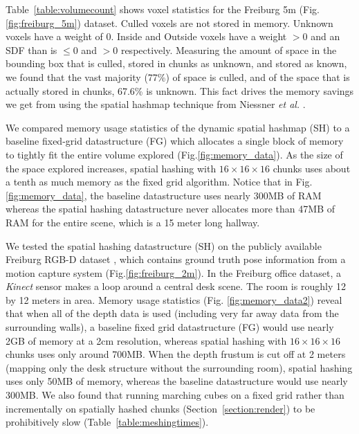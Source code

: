 \documentclass[conference]{IEEEtran}
\newcommand{\sref}[1]{Section~\ref{#1}}
\newcommand{\figref}[1]{Fig.\ref{#1}}
\newcommand{\tabref}[1]{Table~\ref{#1}}
\newcommand{\naive}{baseline\xspace}
\newcommand{\etal}{\textit{et al. }}
\begin{document}
\tabref{table:volumecount} shows voxel statistics for the Freiburg 5m
(\figref{fig:freiburg_5m}) dataset. Culled voxels are not stored in  memory.
Unknown voxels have a weight of 0. Inside and Outside voxels have a weight $>
0$ and an SDF than is $\leq 0$ and $> 0$ respectively. Measuring the amount of
space in the bounding box that is culled, stored in chunks as unknown, and
stored as known, we found that the vast majority (77\%) of space is culled, and
of the space that is actually stored in chunks, 67.6\% is unknown. This fact
drives the memory savings we get from using the spatial hashmap
technique from Niessner \etal \cite{NiessnerHashing}.

We compared memory usage statistics of the dynamic spatial hashmap (SH) to
a \naive fixed-grid datastructure (FG) which allocates a single block of memory to
tightly fit the entire volume explored (\figref{fig:memory_data}). As the size of the space
explored increases,  spatial hashing  with $16 \times 16 \times
16$ chunks uses about a tenth as much memory as the fixed grid algorithm. Notice
that in \figref{fig:memory_data}, the \naive datastructure uses nearly 300MB of RAM 
whereas the spatial hashing datastructure never allocates more than 47MB of RAM
for the entire scene, which is a 15 meter long hallway.

We tested the spatial hashing datastructure (SH) on the publicly available Freiburg
RGB-D dataset \cite{FREIBURG}, which contains ground truth pose information from a motion
capture system (\figref{fig:freiburg_2m}). In the Freiburg office dataset, a
\textit{Kinect} sensor makes a loop around a central desk scene. The room is
roughly 12 by 12 meters in area.  Memory usage statistics (Fig.
\ref{fig:memory_data2}) reveal that when all of the depth data is used
(including very far away data from the surrounding walls), a \naive fixed grid
datastructure (FG) would use nearly 2GB of memory at a 2cm resolution, whereas
spatial hashing with $16 \times 16 \times 16$ chunks uses only around 700MB.
When the depth frustum is cut off at 2 meters (mapping only the desk structure
without the surrounding room), spatial hashing uses only 50MB of memory, whereas
the \naive datastructure would use nearly 300MB. We also found that running marching
cubes on a fixed grid rather than incrementally on spatially hashed chunks
(\sref{section:render}) to be prohibitively slow (\tabref{table:meshingtimes}).
\end{document}
